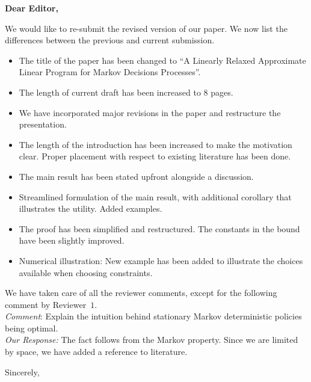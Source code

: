 \documentclass{letter}
\begin{document}

\begin{letter}{} %


\opening{\textbf{Dear Editor,}}
We would like to re-submit the revised version of our paper. We now list the differences between the previous and current submission.
\begin{itemize}
\item The title of the paper has been changed to ``A Linearly Relaxed Approximate Linear Program for Markov Decisions Processes''.
\item The length of current draft has been increased to 8 pages.
\item We have incorporated major revisions in the paper and restructure the presentation.
\item The length of the introduction has been increased to make the motivation clear. Proper placement with respect to existing literature has been done.
\item The main result has been stated upfront alongside a discussion.
\item Streamlined formulation of the main result, with additional corollary that illustrates the utility. Added examples.
\item The proof has been simplified and restructured. The constants in the bound have been slightly improved.
\item Numerical illustration: New example has been added to illustrate the choices available when choosing constraints.
\end{itemize}
We have taken care of all the reviewer comments, except for the following comment by Reviewer~$1$.\\
\emph{Comment}: Explain the intuition behind stationary Markov deterministic policies being optimal.\\
\emph{Our Response:} The fact follows from the Markov property. Since we are limited by space, we have added a reference to literature.


\vspace{2\parskip} %
\closing{Sincerely,}
\vspace{2\parskip} %


\end{letter}
\end{document}
